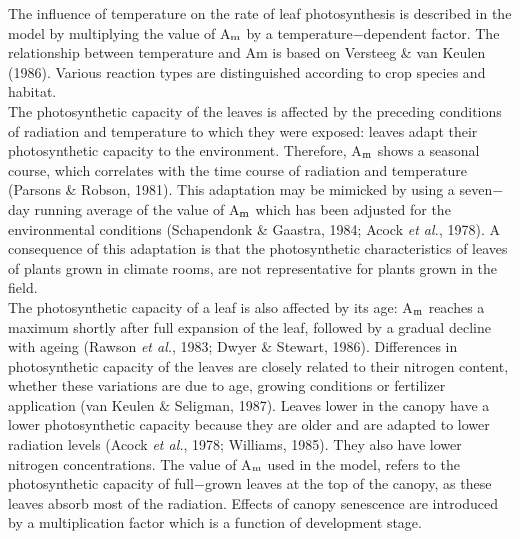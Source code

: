 \documentclass[11pt]{article}
\begin{document}
\bigskip
\bigskip
The influence of temperature on the rate of leaf photosynthesis is described in the model
by multiplying the value of A$_{{\rm m}}$ by a temperature$-$dependent factor. The relationship
between temperature and Am is based on Versteeg \& van Keulen (1986). Various
reaction types are distinguished according to crop species and habitat.  \\
The photosynthetic capacity of the leaves is affected by the preceding conditions of
radiation and temperature to which they were exposed: leaves adapt their photosyn\-thetic
capacity to the environment. Therefore, A$_{{\rm m}}$ shows a seasonal course, which correlates
with the time course of radiation and temperature (Parsons \& Robson, 1981). This
adaptation may be mimicked by using a seven$-$day running average of the value of A$_{{\rm m}}$
which has been adjusted for the environmental conditions (Schapendonk \& Gaastra, 1984;
Acock {\it et al.\/}, 1978). A consequence of this adaptation is that the photosynthetic character\-istics of leaves of plants grown in climate rooms, are not representative for plants grown
in the field.   \\
The photosynthetic capacity of a leaf is also affected by its age: A$_{{\rm m}}$ reaches a maximum
shortly after full expansion of the leaf, followed by a gradual decline with ageing
(Rawson {\it et al.\/}, 1983; Dwyer \& Stewart, 1986). Differences in photosynthetic capacity of
the leaves are closely related to their nitrogen content, whether these variations are due to
age, growing conditions or fertilizer application (van Keulen \& Seligman, 1987). Leaves
lower in the canopy have a lower {\nobreak}photosynthetic capacity because they are older and are
adapted to lower radiation levels (Acock {\it et al.\/}, 1978; Williams, 1985). They also have
lower nitrogen concentrations. The value of A$_{{\rm m}}$ used in the model, refers to the
{\nobreak}photosynthetic capacity of full$-$grown leaves at the top of the canopy, as these leaves
absorb most of the radiation. Effects of canopy senes\-cence are introduced by a multiplica\-tion factor which is a function of development stage.
\end{document}
